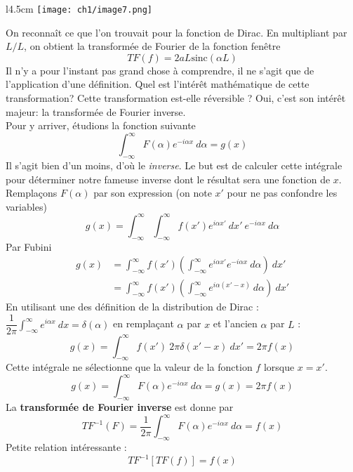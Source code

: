 \begin{wrapfigure}[8]{l}{4.5cm}
\vspace{-25mm}
\texttt{[image: ch1/image7.png]}
\end{wrapfigure}
On reconnaît ce que l'on trouvait pour la fonction de Dirac. En multipliant par $L/L$, on obtient 
la transformée de Fourier de la fonction fenêtre
\begin{equation}
TF(f) = 2aL\text{sinc}(\alpha L)
\end{equation}
Il n'y a pour l'instant pas grand chose à comprendre, il ne s'agit que de l'application d'une 
définition. Quel est l'intérêt mathématique de cette transformation? Cette transformation est-elle
réversible ? Oui, c'est son intérêt majeur: la transformée de Fourier inverse.\\
Pour y arriver, étudions la fonction suivante
\begin{equation}
\int_{-\infty}^\infty F(\alpha)e^{-i\alpha x}\ d\alpha  = g(x)
\end{equation}
\danger Il s'agit bien d'un moins, d'où le \textit{inverse}. Le but est de calculer cette intégrale 
pour déterminer notre fameuse inverse dont le résultat sera une fonction de $x$. Remplaçons $F(\alpha)$ 
par son expression (on note $x'$ pour ne pas confondre les variables)
\begin{equation}
g(x)= \int_{-\infty}^\infty \int_{-\infty}^\infty  f(x')e^{i\alpha x'}\ dx'\ e^{-i\alpha x}\ d\alpha
\end{equation}
Par Fubini
\begin{equation}
\begin{array}{ll}
g(x) &= \int_{-\infty}^\infty  f(x') (\int_{-\infty}^\infty  e^{i\alpha x'}e^{-i\alpha x}\ d\alpha)\ dx'\\
&= \int_{-\infty}^\infty  f(x') (\int_{-\infty}^\infty  e^{i\alpha (x'-x)}\ d\alpha)\ dx'
\end{array}
\end{equation}
En utilisant une des définition de la distribution de Dirac : $\dfrac{1}{2\pi}\int_{-\infty}^\infty 
e^{i\alpha x}\ dx  = \delta(\alpha)$ en remplaçant $\alpha$ par $x$ et l'ancien $\alpha$ par $L$ :
\begin{equation}
g(x) = \int_{-\infty}^\infty  f(x')\ 2\pi\delta(x'-x)\ dx' = 2\pi f(x)
\end{equation}
Cette intégrale ne sélectionne que la valeur de la fonction $f$ lorsque $x=x'$. 
\begin{equation}
g(x) = \int_{-\infty}^\infty F(\alpha)e^{-i\alpha x}\ d\alpha  = g(x) = 2\pi f(x)
\end{equation}
La \textbf{transformée de Fourier inverse} est donne par
\begin{equation}
TF^{-1}(F) = \frac{1}{2\pi}\int_{-\infty}^\infty F(\alpha)e^{-i\alpha x}\ d\alpha = f(x)
\end{equation}
Petite relation intéressante :
\begin{equation}
TF^{-1}[TF(f)] = f(x)
\end{equation}

